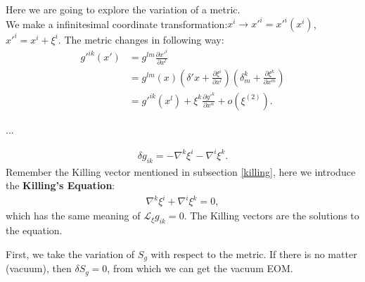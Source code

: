 \documentclass[openany,10pt]{book}
\theoremstyle{definition}
\theoremstyle{definition}
\theoremstyle{remark}
\newcommand{\be}{\begin{eqnarray}}
\newcommand{\ee}{\end{eqnarray}}
\begin{document}
\hrulefill
\rem
Here we are going to explore the variation of a metric.\\
We make a infinitesimal coordinate transformation:$x^i\to x'^i=x'^i(x^i)$,$x'^i=x^i+\xi^i$. The metric changes in following way:
\begin{equation}
\begin{aligned}
    g'^{ik}(x')&=g^{lm}\frac{\partial x'^i}{\partial x^l}\\
    &=g^{lm}(x)\left(\delta'x+\frac{\partial\xi^i}{\partial x^l}\right)\left(\delta_m^k+\frac{\partial\xi^k}{\partial x^m}\right)\\
    &=g'^{ik}\left(x^l\right)+\xi^k\frac{\partial g'^k}{\partial x^\alpha}+o\left(\xi^{(2)}\right).
    \end{aligned}
\end{equation}

...

\be
\delta g_{ik}=-\nabla^k\xi^i-\nabla^i\xi^k.
\ee
Remember the Killing vector mentioned in subsection \ref{killing}, here we introduce the \textbf{Killing's Equation}:
\be
\nabla^k\xi^i+\nabla^i\xi^k=0,
\ee
which has the same meaning of $\mathcal{L}_{\xi}g_{ik}=0$. The Killing vectors are the solutions to the equation.

\hrulefill

\vspace{3mm}

First, we take the variation of $S_g$ with respect to the metric. If there is no matter (vacuum), then $\delta S_g=0$, from which we can get the vacuum EOM.\\
\end{document}
